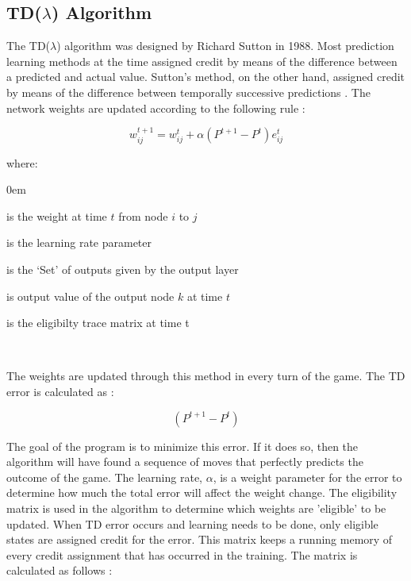 \documentclass{sig-alternate-05-2015}
\begin{document}
\subsection{TD(\(\lambda\)) Algorithm}

	The TD(\(\lambda\)) algorithm was designed by Richard Sutton in 1988. Most prediction learning methods at the time assigned credit by means of the difference between a predicted and actual value. Sutton's method, on the other hand, assigned credit by means of the difference between temporally successive predictions \cite{sutton1988learning}. The network weights are updated according to the following rule \cite{sutton1989implementation}:
	
\begin{equation}
w_{ij}^{t+1} = w_{ij}^t + \alpha (P^{t+1} - P^{t}) e_{ij}^t 
\end{equation}

where:
\begin{description}
\itemsep0em 
\item [w_{ij}^{t}] is the weight at time $t$ from node $i$ to $j$
\item[\alpha] is the learning rate parameter
\item[O] is the `Set' of outputs given by the output layer
\item[P_k^{t}] is output value of the output node $k$ at time $t$
\item[e_{ij}^t] is the eligibilty trace matrix at time t
\end{description} 
\
	
The weights are updated through this method in every turn of the game. The TD error is calculated as \cite{sutton1989implementation}: 

\begin{equation}
(P^{t+1} - P^t)
\end{equation}

The goal of the program is to minimize this error. If it does so, then the algorithm will have found a sequence of moves that perfectly predicts the outcome of the game. The learning rate, $\alpha$, is a weight parameter for the error to determine how much the total error will affect the weight change. The eligibility matrix is used in the algorithm to determine which weights are 'eligible' to be updated. When TD error occurs and learning needs to be done, only eligible states are assigned credit for the error. This matrix keeps a running memory of every credit assignment that has occurred in the training. The matrix is calculated as follows \cite{sutton1989implementation}:
\end{document}
